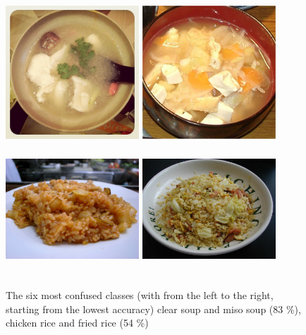 \begin{figure}
    \centering
    \includegraphics[height=5cm, width=5cm]{img/confusing_clear_soup.jpg}
    \includegraphics[height=5cm, width=5cm]{img/confusing_miso_soup.jpg}
    \includegraphics[height=5cm, width=5cm]{img/confusing_chicken_rice.jpg}
    \includegraphics[height=5cm, width=5cm]{img/confusing_fried_rice.jpg}
    \caption[Most confused classes]{The six most confused classes (with from the left to the right, starting from the lowest accuracy) clear soup and miso soup (83 \%), chicken rice and fried rice (54 \%)}
    \label{fig:confusing_3}
\end{figure}

